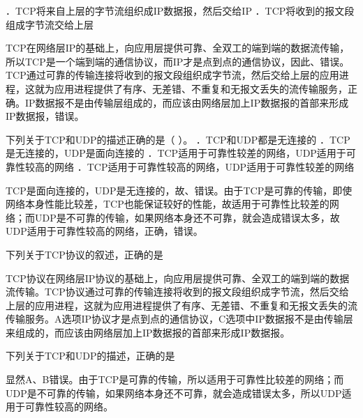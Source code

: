 ．TCP将来自上层的字节流组织成IP数据报，然后交给IP
．TCP将收到的报文段组成字节流交给上层
\par{}
\begin{solution}TCP在网络层IP的基础上，向应用层提供可靠、全双工的端到端的数据流传输，所以TCP是一个端到端的通信协议，而IP才是点到点的通信协议，因此、错误。TCP通过可靠的传输连接将收到的报文段组织成字节流，然后交给上层的应用进程，这就为应用进程提供了有序、无差错、不重复和无报文丢失的流传输服务，正确。IP数据报不是由传输层组成的，而应该由网络层加上IP数据报的首部来形成IP数据报，错误。
\end{solution}
\question 下列关于TCP和UDP的描述正确的是（ ）。 ．TCP和UDP都是无连接的
．TCP是无连接的，UDP是面向连接的
．TCP适用于可靠性较差的网络，UDP适用于可靠性较高的网络
．TCP适用于可靠性较高的网络，UDP适用于可靠性较差的网络
\par{}
\begin{solution}TCP是面向连接的，UDP是无连接的，故、错误。由于TCP是可靠的传输，即使网络本身性能比较差，TCP也能保证较好的性能，故适用于可靠性比较差的网络；而UDP是不可靠的传输，如果网络本身还不可靠，就会造成错误太多，故UDP适用于可靠性较高的网络，正确，错误。
\end{solution}
\question 下列关于TCP协议的叙述，正确的是
\par{}
\begin{solution}TCP协议在网络层IP协议的基础上，向应用层提供可靠、全双工的端到端的数据流传输。TCP协议通过可靠的传输连接将收到的报文段组织成字节流，然后交给上层的应用进程，这就为应用进程提供了有序、无差错、不重复和无报文丢失的流传输服务。A选项IP协议才是点到点的通信协议，C选项中IP数据报不是由传输层来组成的，而应该由网络层加上IP数据报的首部来形成IP数据报。
\end{solution}
\question 下列关于TCP和UDP的描述，正确的是
\par{}
\begin{solution}显然A、B错误。由于TCP是可靠的传输，所以适用于可靠性比较差的网络；而UDP是不可靠的传输，如果网络本身还不可靠，就会造成错误太多，所以UDP适用于可靠性较高的网络。
\end{solution}
